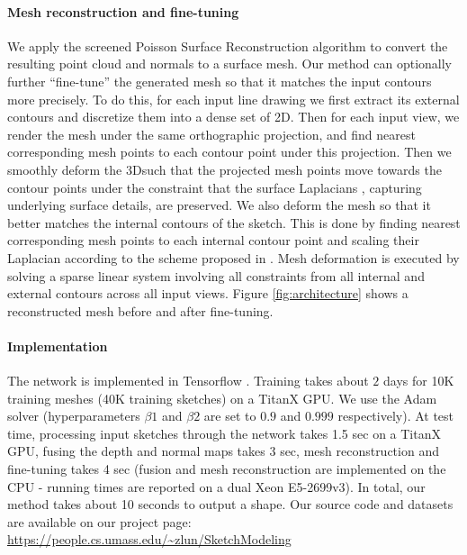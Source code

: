 \documentclass[10pt, conference, compsocconf]{IEEEtran}
\begin{document}
\vspace{-1mm}\paragraph{Mesh reconstruction and fine-tuning}
We apply the screened Poisson Surface Reconstruction algorithm \cite{Kazhdan:2013:SPS} to convert the resulting point cloud and normals to a surface mesh. Our method can optionally further ``fine-tune'' the generated mesh so that it matches the input contours more precisely. To do this, for each input line drawing we first extract its external contours and discretize them into a dense set of 2D\points. Then for each input view, we render the mesh under the same orthographic projection, and find nearest corresponding mesh points to each contour point under this projection. Then we smoothly deform the 3D\mesh such that the projected mesh points move towards the contour points under the constraint that the surface Laplacians \cite{Nealen:2005:SID}, capturing   underlying  surface details, are preserved. We also deform the mesh so that it better matches  the internal contours of the sketch. This is done by finding nearest corresponding mesh points to each internal contour point and scaling their Laplacian according to the scheme proposed in \cite{Nealen:2005:SID}. Mesh deformation is executed by solving a  sparse linear system involving all constraints from all internal and external contours across all input views. Figure \ref{fig:architecture} shows a reconstructed mesh before and after fine-tuning.
\vspace{-1mm}\paragraph{Implementation} The network is implemented in Tensorflow \cite{tensorflow2015-whitepaper}. Training takes about $2$ days for 10K training meshes (40K training sketches) on a TitanX GPU. We use the Adam solver \cite{Adam} (hyperparameters $\beta1$ and $\beta2$ are set to $0.9$ and $0.999$ respectively). At test time, processing input sketches through the network takes 1.5 sec on a TitanX GPU, fusing the depth and normal maps takes 3 sec, mesh reconstruction and fine-tuning takes  4 sec (fusion and mesh reconstruction are implemented on the CPU - running times are reported on a dual Xeon E5-2699v3). In total, our method takes about 10 seconds to output  a shape.
Our source code and datasets are available on our project page:\\
{\footnotesize \url{https://people.cs.umass.edu/~zlun/SketchModeling}}
\end{document}
